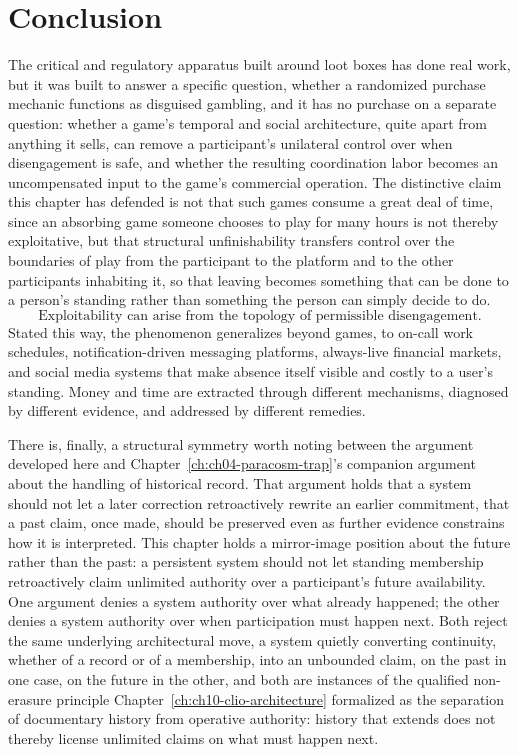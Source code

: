 \section{Conclusion}

The critical and regulatory apparatus built around loot boxes has done real work, but it was built to answer a specific question, whether a randomized purchase mechanic functions as disguised gambling, and it has no purchase on a separate question: whether a game's temporal and social architecture, quite apart from anything it sells, can remove a participant's unilateral control over when disengagement is safe, and whether the resulting coordination labor becomes an uncompensated input to the game's commercial operation. The distinctive claim this chapter has defended is not that such games consume a great deal of time, since an absorbing game someone chooses to play for many hours is not thereby exploitative, but that structural unfinishability transfers control over the boundaries of play from the participant to the platform and to the other participants inhabiting it, so that leaving becomes something that can be done to a person's standing rather than something the person can simply decide to do.
\[
\boxed{\text{Exploitability can arise from the topology of permissible disengagement.}}
\]
Stated this way, the phenomenon generalizes beyond games, to on-call work schedules, notification-driven messaging platforms, always-live financial markets, and social media systems that make absence itself visible and costly to a user's standing. Money and time are extracted through different mechanisms, diagnosed by different evidence, and addressed by different remedies.

There is, finally, a structural symmetry worth noting between the argument developed here and Chapter~\ref{ch:ch04-paracosm-trap}'s companion argument about the handling of historical record. That argument holds that a system should not let a later correction retroactively rewrite an earlier commitment, that a past claim, once made, should be preserved even as further evidence constrains how it is interpreted. This chapter holds a mirror-image position about the future rather than the past: a persistent system should not let standing membership retroactively claim unlimited authority over a participant's future availability. One argument denies a system authority over what already happened; the other denies a system authority over when participation must happen next. Both reject the same underlying architectural move, a system quietly converting continuity, whether of a record or of a membership, into an unbounded claim, on the past in one case, on the future in the other, and both are instances of the qualified non-erasure principle Chapter~\ref{ch:ch10-clio-architecture} formalized as the separation of documentary history from operative authority: history that extends does not thereby license unlimited claims on what must happen next.
